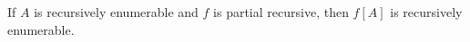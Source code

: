 If $A$ is recursively enumerable and $f$ is partial recursive, then $f[A]$ is recursively enumerable.
